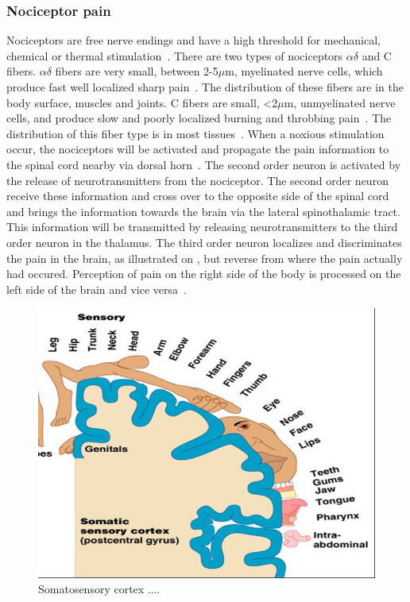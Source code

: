 \subsubsection{Nociceptor pain}
Nociceptors are free nerve endings and have a high threshold for mechanical, chemical or thermal stimulation~\cite{Steeds2013}. There are two types of nociceptors $\alpha\delta$ and C fibers. $\alpha\delta$ fibers are very small, between 2-5$\mu$m, myelinated nerve cells, which produce fast well localized sharp pain~\cite{Steeds2013}. The distribution of these fibers are in the body surface, muscles and joints. C fibers are small, <2$\mu$m, unmyelinated nerve cells, and produce slow and poorly localized burning and throbbing pain~\cite{Steeds2013}. The distribution of this fiber type is in most tissues~\cite{Steeds2013}. 
When a noxious stimulation occur, the nociceptors will be activated and propagate the pain information to the spinal cord nearby via dorsal horn~\cite{Martini2012}.%
The second order neuron is activated by the release of neurotransmitters from the nociceptor. The second order neuron receive these information and cross over to the opposite side of the spinal cord and brings the information towards the brain via the lateral spinothalamic tract. This information will be transmitted by releasing neurotransmitters to the third order neuron in the thalamus. The third order neuron localizes and discriminates the pain in the brain, as illustrated on , but reverse from where the pain actually had occured. Perception of pain on the right side of the body is processed on the left side of the brain and vice versa~\cite{Martini2012}. 


\begin{figure}[H]
	\includegraphics[width=.5\textwidth]{figures/somatosensorycortex.jpg} 
	\caption{Somatosensory cortex .... }
	\label{fig:somatosensorycortex}  
\end{figure}   


